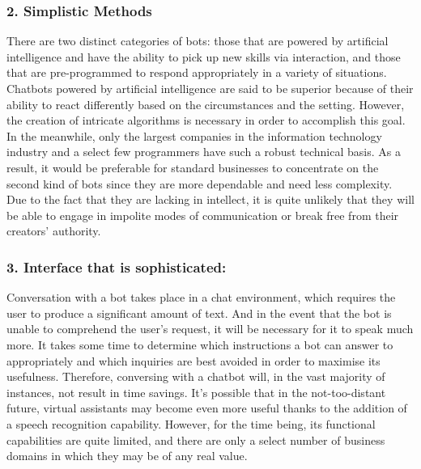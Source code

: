 \subsubsection{2. Simplistic Methods}
There are two distinct categories of bots: those that are powered by artificial intelligence and have the ability to pick up new skills via interaction, and those that are pre-programmed to respond appropriately in a variety of situations. Chatbots powered by artificial intelligence are said to be superior because of their ability to react differently based on the circumstances and the setting. However, the creation of intricate algorithms is necessary in order to accomplish this goal. In the meanwhile, only the largest companies in the information technology industry and a select few programmers have such a robust technical basis. As a result, it would be preferable for standard businesses to concentrate on the second kind of bots since they are more dependable and need less complexity. Due to the fact that they are lacking in intellect, it is quite unlikely that they will be able to engage in impolite modes of communication or break free from their creators' authority.

\subsubsection{3. Interface that is sophisticated:}
Conversation with a bot takes place in a chat environment, which requires the user to produce a significant amount of text. And in the event that the bot is unable to comprehend the user's request, it will be necessary for it to speak much more. It takes some time to determine which instructions a bot can answer to appropriately and which inquiries are best avoided in order to maximise its usefulness. Therefore, conversing with a chatbot will, in the vast majority of instances, not result in time savings. It's possible that in the not-too-distant future, virtual assistants may become even more useful thanks to the addition of a speech recognition capability. However, for the time being, its functional capabilities are quite limited, and there are only a select number of business domains in which they may be of any real value.

